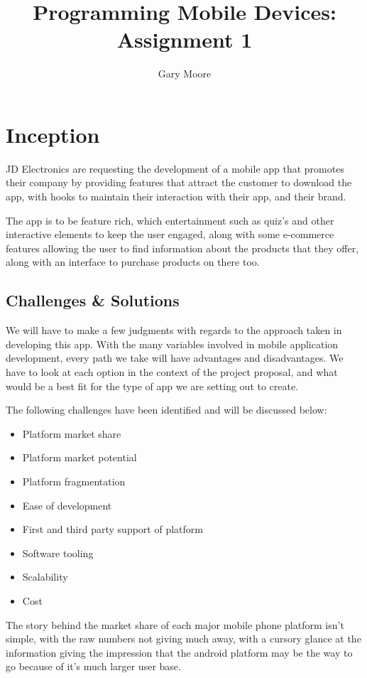 \documentclass{scrreprt}
\title{Programming Mobile Devices: Assignment 1}
\author{Gary Moore}
\begin{document}
\maketitle
\tableofcontents

\chapter{Inception}\label{research}

JD Electronics are requesting the development of a mobile app that promotes their company by providing features that attract the customer to download the app, with hooks to maintain their interaction with their app, and their brand.

The app is to be feature rich, which entertainment such as quiz's and other  interactive elements to keep the user engaged, along with some e-commerce features allowing the user to find information about the products that they offer, along with an interface to purchase products on there too.

\section{Challenges \& Solutions}

We will have to make a few judgments with regards to the approach taken in developing this app. With the many variables involved in mobile application development, every path we take will have advantages and disadvantages. We have to look at each option in the context of the project proposal, and what would be a best fit for the type of app we are setting out to create.

The following challenges have been identified and will be discussed below:

\begin{itemize}
    \item Platform market share
    \item Platform market potential
    \item Platform fragmentation
    \item Ease of development
    \item First and third party support of platform
    \item Software tooling
    \item Scalability
    \item Cost
\end{itemize}

The story behind the market share of each major mobile phone platform isn't simple, with the raw numbers not giving much away, with a cursory glance at the information giving the impression that the android platform may be the way to go because of it's much larger user base.
\end{document}

